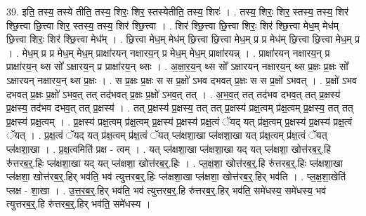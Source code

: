 \documentclass[17pt]{extarticle}
\begin{document}
39. इति॒ तस्य॒ तस्ये तीति॒ तस्य॒ शिरः॒ शिर॒ स्तस्येतीति॒ तस्य॒ शिरः॑ । . तस्य॒ शिरः॒ शिर॒ स्तस्य॒ तस्य॒ शिर॑ श्छि॒त्त्वा छि॒त्त्वा शिर॒ स्तस्य॒ तस्य॒ शिर॑ श्छि॒त्त्वा । . शिर॑ श्छि॒त्त्वा छि॒त्त्वा शिरः॒ शिर॑ श्छि॒त्त्वा मेध॒म् मेध॑म् छि॒त्त्वा शिरः॒ शिर॑ श्छि॒त्त्वा मेध᳚म् । . छि॒त्त्वा मेध॒म् मेध॑म् छि॒त्त्वा छि॒त्त्वा मेध॒म् प्र प्र मेध॑म् छि॒त्त्वा छि॒त्त्वा मेध॒म् प्र । . मेध॒म् प्र प्र मेध॒म् मेध॒म् प्राक्षा॑रयन् नक्षारय॒न् प्र मेध॒म् मेध॒म् प्राक्षा॑रयन्न् । . प्राक्षा॑रयन् नक्षारय॒न् प्र प्राक्षा॑रय॒न् थ्स सो᳚ ऽक्षारय॒न् प्र प्राक्षा॑रय॒न् थ्सः । . अ॒क्षा॒र॒य॒न् थ्स सो᳚ ऽक्षारयन् नक्षारय॒न् थ्स प्र॒क्षः प्र॒क्षः सो᳚ ऽक्षारयन् नक्षारय॒न् थ्स प्र॒क्षः । . स प्र॒क्षः प्र॒क्षः स स प्र॒क्षो॑ ऽभव दभवत् प्र॒क्षः स स प्र॒क्षो॑ ऽभवत् । . प्र॒क्षो॑ ऽभव दभवत् प्र॒क्षः प्र॒क्षो॑ ऽभव॒त् तत् तद॑भवत् प्र॒क्षः प्र॒क्षो॑ ऽभव॒त् तत् । . अ॒भ॒व॒त् तत् तद॑भव दभव॒त् तत् प्र॒क्षस्य॑ प्र॒क्षस्य॒ तद॑भव दभव॒त् तत् प्र॒क्षस्य॑ । . तत् प्र॒क्षस्य॑ प्र॒क्षस्य॒ तत् तत् प्र॒क्षस्य॑ प्रक्ष॒त्वम् प्र॑क्ष॒त्वम् प्र॒क्षस्य॒ तत् तत् प्र॒क्षस्य॑ प्रक्ष॒त्वम् । . प्र॒क्षस्य॑ प्रक्ष॒त्वम् प्र॑क्ष॒त्वम् प्र॒क्षस्य॑ प्र॒क्षस्य॑ प्रक्ष॒त्वं ॅयद् यत् प्र॑क्ष॒त्वम् प्र॒क्षस्य॑ प्र॒क्षस्य॑ प्रक्ष॒त्वं ॅयत् । . प्र॒क्ष॒त्वं ॅयद् यत् प्र॑क्ष॒त्वम् प्र॑क्ष॒त्वं ॅयत् प्ल॑क्षशा॒खा प्ल॑क्षशा॒खा यत् प्र॑क्ष॒त्वम् प्र॑क्ष॒त्वं ॅयत् प्ल॑क्षशा॒खा । . प्र॒क्ष॒त्वमिति॑ प्रक्ष - त्वम् । . यत् प्ल॑क्षशा॒खा प्ल॑क्षशा॒खा यद् यत् प्ल॑क्षशा॒ खोत्त॑रब॒र्॒.हि रु॑त्तरब॒र्॒.हिः प्ल॑क्षशा॒खा यद् यत् प्ल॑क्षशा॒ खोत्त॑रब॒र्॒.हिः । . प्ल॒क्ष॒शा॒ खोत्त॑रब॒र्॒.हि रु॑त्तरब॒र्॒.हिः प्ल॑क्षशा॒खा प्ल॑क्षशा॒ खोत्त॑रब॒र्॒.हिर् भव॑ति॒ भव॑ त्युत्तरब॒र्॒.हिः प्ल॑क्षशा॒खा प्ल॑क्षशा॒ खोत्त॑रब॒र्॒.हिर् भव॑ति । . प्ल॒क्ष॒शा॒खेति॑ प्लक्ष - शा॒खा । . उ॒त्त॒र॒ब॒र्॒.हिर् भव॑ति॒ भव॑ त्युत्तरब॒र्॒.हि रु॑त्तरब॒र्॒.हिर् भव॑ति॒ समे॑धस्य॒ समे॑धस्य॒ भव॑ त्युत्तरब॒र्॒.हि रु॑त्तरब॒र्॒.हिर् भव॑ति॒ समे॑धस्य । \newline
\end{document}
